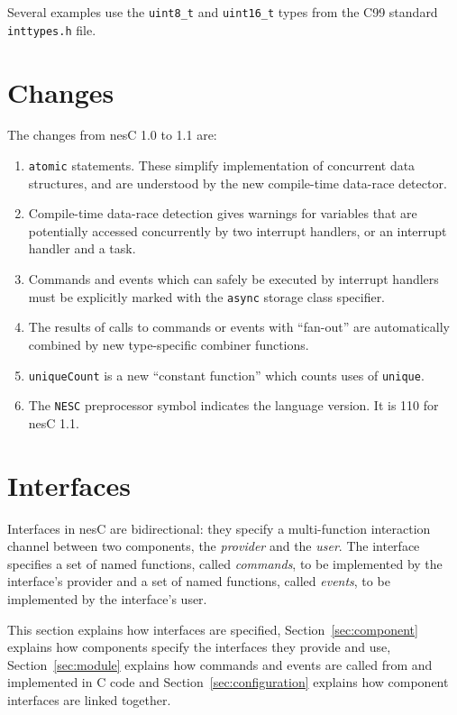 \documentclass[11pt,letterpaper]{article}
\newcommand{\kw}[1]{{\tt #1}}
\newcommand{\code}[1]{{\tt #1}}
\newcommand{\file}[1]{{\tt #1}}
\newcommand{\nesc}{nesC\xspace}
\begin{document}
Several examples use the \code{uint8\_t} and \code{uint16\_t} types from
the C99 standard \file{inttypes.h} file.

\section{Changes}
\label{sec:changes}

The changes from \nesc 1.0 to 1.1 are:
\begin{enumerate}
\item \kw{atomic} statements. These simplify implementation of concurrent
data structures, and are understood by the new compile-time data-race
detector.

\item Compile-time data-race detection gives warnings for variables that
are potentially accessed concurrently by two interrupt handlers, or an
interrupt handler and a task.

\item Commands and events which can safely be executed by interrupt
handlers must be explicitly marked with the \kw{async} storage class
specifier.

\item The results of calls to commands or events with ``fan-out'' are
automatically combined by new type-specific combiner functions.

\item \kw{uniqueCount} is a new ``constant function'' which counts
uses of \kw{unique}.

\item The \kw{NESC} preprocessor symbol indicates the language version. It
is 110 for \nesc 1.1.
 
\end{enumerate}

\section{Interfaces}
\label{sec:interface}

Interfaces in \nesc are bidirectional: they specify a multi-function
interaction channel between two components, the \emph{provider} and the
\emph{user}. The interface specifies a set of named functions, called
\emph{commands}, to be implemented by the interface's provider and a set of
named functions, called \emph{events}, to be implemented by the interface's
user.

This section explains how interfaces are specified,
Section~\ref{sec:component} explains how components specify the interfaces
they provide and use, Section~\ref{sec:module} explains how commands and
events are called from and implemented in C code and
Section~\ref{sec:configuration} explains how component interfaces are
linked together.
\end{document}
